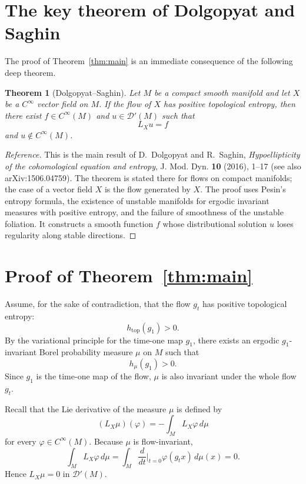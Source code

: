 \documentclass[11pt]{article}
\newtheorem{theorem}{Theorem}[section]
\begin{document}
\section{The key theorem of Dolgopyat and Saghin}

The proof of Theorem~\ref{thm:main} is an immediate consequence of the following deep theorem.

\begin{theorem}[Dolgopyat--Saghin]\label{thm:DS}
Let \(M\) be a compact smooth manifold and let \(X\) be a \(C^\infty\) vector field on \(M\). If the flow of \(X\) has positive topological entropy, then there exist \(f\in C^\infty(M)\) and \(u\in\mathcal D'(M)\) such that
\[
L_X u=f
\]
and \(u\notin C^\infty(M)\).
\end{theorem}

\begin{proof}[Reference]
This is the main result of D.~Dolgopyat and R.~Saghin, \emph{Hypoellipticity of the cohomological equation and entropy}, J. Mod. Dyn. \textbf{10} (2016), 1--17 (see also arXiv:1506.04759). The theorem is stated there for flows on compact manifolds; the case of a vector field \(X\) is the flow generated by \(X\). The proof uses Pesin's entropy formula, the existence of unstable manifolds for ergodic invariant measures with positive entropy, and the failure of smoothness of the unstable foliation. It constructs a smooth function \(f\) whose distributional solution \(u\) loses regularity along stable directions.
\end{proof}

\section{Proof of Theorem~\ref{thm:main}}

Assume, for the sake of contradiction, that the flow \(g_t\) has positive topological entropy:
\[
h_{\mathrm{top}}(g_1)>0.
\]
By the variational principle for the time-one map \(g_1\), there exists an ergodic \(g_1\)-invariant Borel probability measure \(\mu\) on \(M\) such that
\[
h_\mu(g_1)>0.
\]
Since \(g_1\) is the time-one map of the flow, \(\mu\) is also invariant under the whole flow \(g_t\).

Recall that the Lie derivative of the measure \(\mu\) is defined by
\[
(L_X\mu)(\varphi)=-\int_M L_X\varphi\,d\mu
\]
for every \(\varphi\in C^\infty(M)\). Because \(\mu\) is flow-invariant,
\[
\int_M L_X\varphi\,d\mu
=\int_M \frac{d}{dt}\Big|_{t=0}\varphi(g_t x)\,d\mu(x)=0.
\]
Hence \(L_X\mu=0\) in \(\mathcal D'(M)\).
\end{document}
